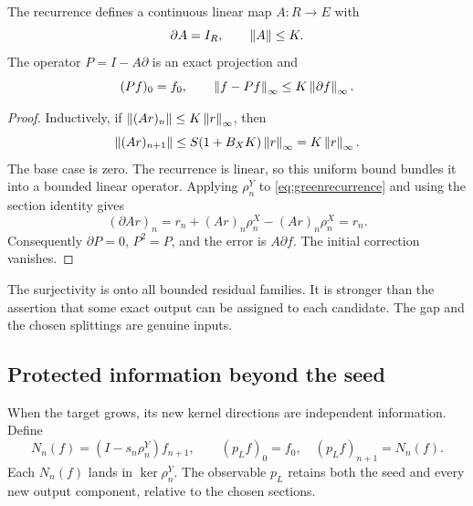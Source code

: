 \begin{theorem}\label{KS20}
The recurrence defines a continuous linear map \(A:R\to E\) with
\[
 \partial A=I_R,\qquad \left\lVert A\right\rVert\le K.
\]
The operator \(P=I-A\partial\) is an exact projection and
\[
 (Pf)_0=f_0,\qquad
 \left\lVert f-Pf\right\rVert_\infty\le K\left\lVert\partial f\right\rVert_\infty.
\]
\end{theorem}
\begin{proof}
Inductively, if \(\left\lVert(Ar)_n\right\rVert\le K\left\lVert r\right\rVert_\infty\), then
\[
 \left\lVert(Ar)_{n+1}\right\rVert
 \le S(1+B_XK)\left\lVert r\right\rVert_\infty=K\left\lVert r\right\rVert_\infty.
\]
The base case is zero. The recurrence is linear, so this uniform bound bundles it into a bounded linear operator. Applying \(\rho^Y_n\) to \eqref{eq:greenrecurrence} and using the section identity gives
\[
 (\partial Ar)_n=r_n+(Ar)_n\rho^X_n-(Ar)_n\rho^X_n=r_n.
\]
Consequently \(\partial P=0\), \(P^2=P\), and the error is \(A\partial f\). The initial correction vanishes.
\end{proof}
The surjectivity is onto all bounded residual families. It is stronger than the assertion that some exact output can be assigned to each candidate. The gap and the chosen splittings are genuine inputs.

\subsection{Protected information beyond the seed}
When the target grows, its new kernel directions are independent information. Define
\[
 N_n(f)=(I-s_n\rho^Y_n)f_{n+1},\qquad
 (p_Lf)_0=f_0,\quad(p_Lf)_{n+1}=N_n(f).
\]
Each \(N_n(f)\) lands in \(\ker\rho^Y_n\). The observable \(p_L\) retains both the seed and every new output component, relative to the chosen sections.

